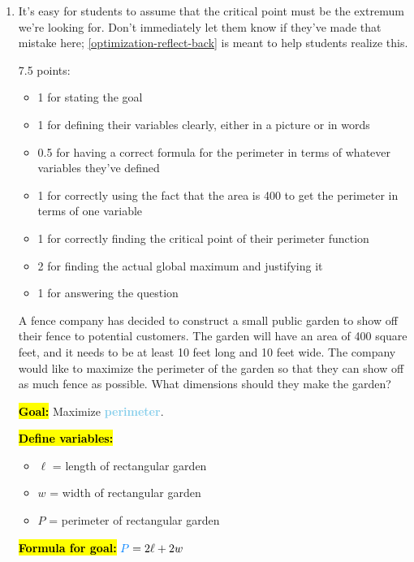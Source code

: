 \documentclass{article}
\newcommand{\highlight}[1]{\boldmath\hl{\textbf{#1}}\unboldmath}
\newcommand{\goal}[1]{\textbf{\textcolor{skyblue}{#1}}}
\begin{document}
\begin{enumerate}
\item \label{optimization-fence}


  \begin{workshop}
    It's easy for students to assume that the critical point must be the extremum we're looking for. Don't immediately let them know if they've made that mistake here; \ref{optimization-reflect-back} is meant to help students realize this.
  \end{workshop}

  \begin{grading}
    7.5 points:
    \begin{itemize}[nosep]
    \item 1 for stating the goal
    \item 1 for defining their variables clearly, either in a picture or in words
    \item 0.5 for having a correct formula for the perimeter in terms of whatever variables they've defined
    \item 1 for correctly using the fact that the area is 400 to get the perimeter in terms of one variable
    \item 1 for correctly finding the critical point of their perimeter function 
    \item 2 for finding the actual global maximum and justifying it 
    \item 1 for answering the question
    \end{itemize}
  \end{grading}

  \begin{problem}[\newpage]
    A fence company has decided to construct a small public garden to show off their fence to potential customers. The garden will have an area of 400 square feet, and it needs to be at least 10 feet long and 10 feet wide. The company would like to maximize the perimeter of the garden so that they can show off as much fence as possible. What dimensions should they make the garden? 
  \end{problem}

  \begin{solution}
    \highlight{Goal:} Maximize \goal{perimeter}.

    \highlight{Define variables:}
    \begin{itemize}[nosep]
      \item $\ell$ = length of rectangular garden
      \item $w$ = width of rectangular garden
      \item $P$ = perimeter of rectangular garden
    \end{itemize}
    \begin{center}
    \end{center}
    \highlight{Formula for goal:} $\goal{$P$} = 2\ell + 2w$


\end{solution}
\end{enumerate}
\end{document}
